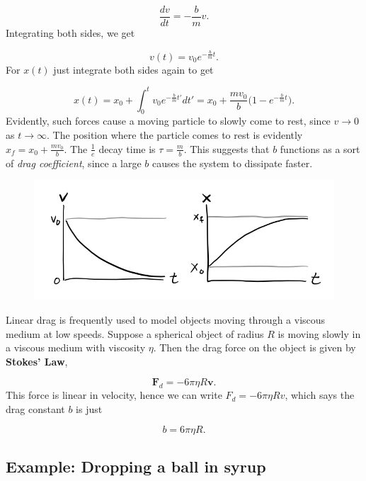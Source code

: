 \documentclass[
  letterpaper,
  DIV=11,
  numbers=noendperiod]{scrreprt}
\begin{document}
\[
\frac{dv}{dt} = -\frac{b}{m} v.
\] Integrating both sides, we get

\[
v(t) = v_0 e^{-\frac{b}{m} t}.
\] For \(x(t)\) just integrate both sides again to get

\[
x(t) = x_0 + \int_0^t v_0 e^{-\frac{b}{m} t'} dt' = x_0 + \frac{mv_0}{b}\big(1 - e^{-\frac{b}{m} t}\big).
\] Evidently, such forces cause a moving particle to slowly come to
rest, since \(v \rightarrow 0\) as \(t \rightarrow \infty\). The
position where the particle comes to rest is evidently
\(x_f = x_0 + \frac{mv_0}{b}\). The \(\frac{1}{e}\) decay time is
\(\tau = \frac{m}{b}\). This suggests that \(b\) functions as a sort of
\emph{drag coefficient}, since a large \(b\) causes the system to
dissipate faster.

\begin{figure}

{\centering \includegraphics[width=5.20833in,height=\textheight]{classical-mechanics/./resources/image-20230214033729125.png}

}

\end{figure}

Linear drag is frequently used to model objects moving through a viscous
medium at low speeds. Suppose a spherical object of radius \(R\) is
moving slowly in a viscous medium with viscosity \(\eta\). Then the drag
force on the object is given by \textbf{Stokes' Law},

\[
\mathbf{F}_d = -6\pi\eta R \mathbf{v}.
\] This force is linear in velocity, hence we can write
\(F_d = -6\pi\eta R v\), which says the drag constant \(b\) is just

\[
b = 6\pi\eta R.
\]

\hypertarget{example-dropping-a-ball-in-syrup}{%
\subsection{Example: Dropping a ball in
syrup}\label{example-dropping-a-ball-in-syrup}}
\end{document}
